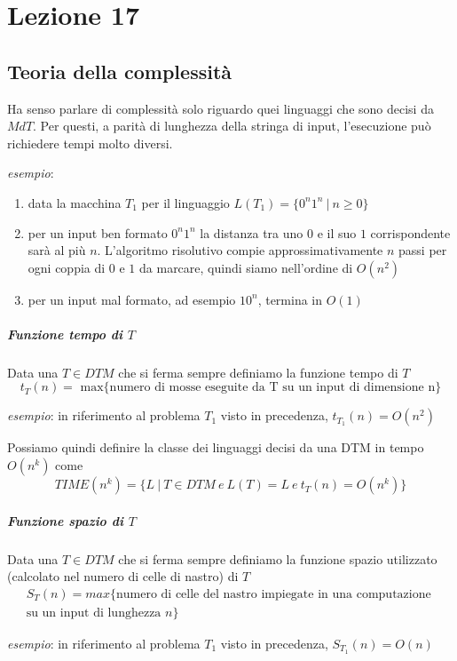 
\section{Lezione 17}

\subsection{Teoria della complessità}

Ha senso parlare di complessità solo riguardo quei linguaggi che sono decisi da $MdT$. Per questi, a parità di lunghezza della stringa di input, l'esecuzione può richiedere tempi molto diversi.

\begin{description}
\item \textit{esempio}: 
\begin{enumerate}
\item data la macchina $T_{1}$ per il linguaggio $L(T_{1}) = \{0^n1^n \ | \ n \geq 0\}$ 
\item per un input ben formato $0^n1^n$ la distanza tra uno $0$ e il suo $1$ corrispondente sarà al più $n$. L'algoritmo risolutivo compie approssimativamente $n$ passi per ogni coppia di $0$ e $1$ da marcare, quindi siamo nell'ordine di $O(n^2)$
\item per un input mal formato, ad esempio $10^n$, termina in $O(1)$
\end{enumerate}
\end{description}

\subparagraph{Funzione tempo di $T$}

Data una $T \in DTM$ che si ferma sempre definiamo la funzione tempo di $T$
\[
	t_{T}(n) = \text{ max\{numero di mosse eseguite da T su un input di dimensione n\} } 
\]
\begin{description}
\item \textit{esempio}:
in riferimento al problema $T_{1}$ visto in precedenza, $t_{T_{1}}(n) = O(n^2)$
\end{description}

Possiamo quindi definire la classe dei linguaggi decisi da una DTM in tempo $O(n^k)$ come
\[
	TIME(n^k) =  \{ L \ | \ T \in DTM \ e \  L(T) = L \ e \ t_{T}(n) = O(n^k) \}
\]

\subparagraph{Funzione spazio di $T$}

Data una $T \in DTM$ che si ferma sempre definiamo la funzione spazio utilizzato (calcolato nel numero di celle di nastro) di $T$
\begin{gather*}
	S_{T}(n) = max\{\text{numero di celle del nastro impiegate in una computazione } \\
	\text{su un input di lunghezza }n\}
\end{gather*}
\begin{description}
\item \textit{esempio}:
in riferimento al problema $T_{1}$ visto in precedenza, $S_{T_{1}}(n) = O(n)$
\end{description}

